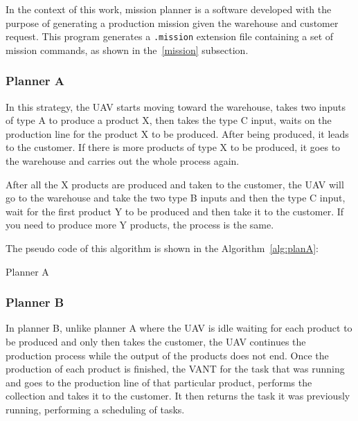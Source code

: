 \documentclass[conference,harvard,brazil,english]{sbatex}
\begin{document}
In the context of this work, mission planner is a software developed with the purpose of generating a production mission given the warehouse and customer request. This program generates a \texttt{.mission} extension file containing a set of mission commands, as shown in the~\ref{mission} subsection.

\subsubsection{Planner A}

In this strategy, the UAV starts moving toward the warehouse, takes two inputs of type A to produce a product X, then takes the type C input, waits on the production line for the product X to be produced. After being produced, it leads to the customer. If there is more products of type X to be produced, it goes to the warehouse and carries out the whole process again.

After all the X products are produced and taken to the customer, the UAV will go to the warehouse and take the two type B inputs and then the type C input, wait for the first product Y to be produced and then take it to the customer. If you need to produce more Y products, the process is the same.

The pseudo code of this algorithm is shown in the Algorithm~\ref{alg:planA}:

\begin{algorithm}[H]
\footnotesize
{}
\caption{Planner A}\label{alg:planA}
\end{algorithm}

\subsubsection{Planner B}
In planner B, unlike planner A where the UAV is idle waiting for each product to be produced and only then takes the customer, the UAV continues the production process while the output of the products does not end. Once the production of each product is finished, the VANT for the task that was running and goes to the production line of that particular product, performs the collection and takes it to the customer. It then returns the task it was previously running, performing a scheduling of tasks.
\end{document}
